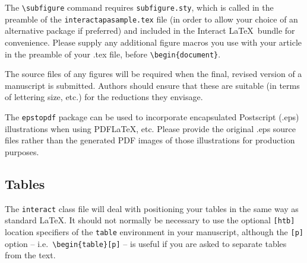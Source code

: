 \documentclass[]{interact}
\theoremstyle{plain}%
\theoremstyle{definition}
\theoremstyle{remark}
\begin{document}
The \verb"\subfigure" command requires \verb"subfigure.sty", which is called in the preamble of the \texttt{interactapasample.tex} file (in order to allow your choice of an alternative package if preferred) and included in the \textsf{Interact} \LaTeX\ bundle for convenience. Please supply any additional figure macros you use with your article in the preamble of your .tex file, before \verb"\begin{document}".

The source files of any figures will be required when the final, revised version of a manuscript is submitted. Authors should ensure that these are suitable (in terms of lettering size, etc.) for the reductions they envisage.

The \texttt{epstopdf} package can be used to incorporate encapsulated Postscript (.eps) illustrations when using PDF\LaTeX, etc. Please provide the original .eps source files rather than the generated PDF images of those illustrations for production purposes.


\subsection{Tables}

The \texttt{interact} class file will deal with positioning your tables in the same way as standard \LaTeX. It should not normally be necessary to use the optional \texttt{[htb]} location specifiers of the \texttt{table} environment in your manuscript, although the \texttt{[p]} option -- i.e.\ \verb"\begin{table}[p]" -- is useful if you are asked to separate tables from the text.
\end{document}
